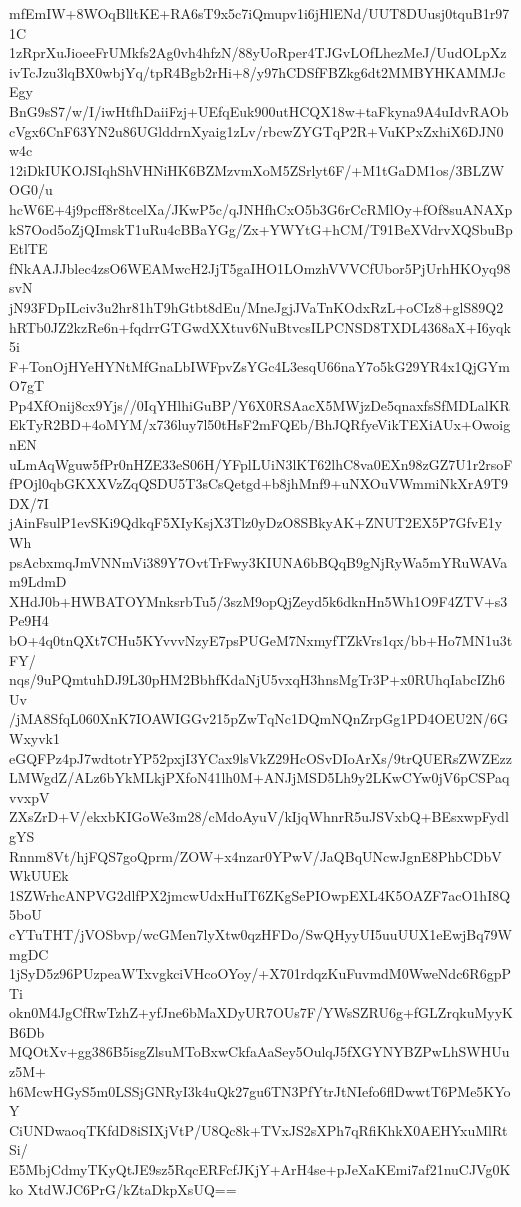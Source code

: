 mfEmIW+8WOqBlltKE+RA6sT9x5c7iQmupv1i6jHlENd/UUT8DUusj0tquB1r971C
1zRprXuJioeeFrUMkfs2Ag0vh4hfzN/88yUoRper4TJGvLOfLhezMeJ/UudOLpXz
ivTcJzu3lqBX0wbjYq/tpR4Bgb2rHi+8/y97hCDSfFBZkg6dt2MMBYHKAMMJcEgy
BnG9sS7/w/I/iwHtfhDaiiFzj+UEfqEuk900utHCQX18w+taFkyna9A4uIdvRAOb
cVgx6CnF63YN2u86UGlddrnXyaig1zLv/rbcwZYGTqP2R+VuKPxZxhiX6DJN0w4c
12iDkIUKOJSIqhShVHNiHK6BZMzvmXoM5ZSrlyt6F/+M1tGaDM1os/3BLZWOG0/u
hcW6E+4j9pcff8r8tcelXa/JKwP5c/qJNHfhCxO5b3G6rCcRMlOy+fOf8suANAXp
kS7Ood5oZjQImskT1uRu4cBBaYGg/Zx+YWYtG+hCM/T91BeXVdrvXQSbuBpEtlTE
fNkAAJJblec4zsO6WEAMwcH2JjT5gaIHO1LOmzhVVVCfUbor5PjUrhHKOyq98svN
jN93FDpILciv3u2hr81hT9hGtbt8dEu/MneJgjJVaTnKOdxRzL+oCIz8+glS89Q2
hRTb0JZ2kzRe6n+fqdrrGTGwdXXtuv6NuBtvcsILPCNSD8TXDL4368aX+I6yqk5i
F+TonOjHYeHYNtMfGnaLbIWFpvZsYGc4L3esqU66naY7o5kG29YR4x1QjGYmO7gT
Pp4XfOnij8cx9Yjs//0IqYHlhiGuBP/Y6X0RSAacX5MWjzDe5qnaxfsSfMDLalKR
EkTyR2BD+4oMYM/x736luy7l50tHsF2mFQEb/BhJQRfyeVikTEXiAUx+OwoignEN
uLmAqWguw5fPr0nHZE33eS06H/YFplLUiN3lKT62lhC8va0EXn98zGZ7U1r2rsoF
fPOjl0qbGKXXVzZqQSDU5T3sCsQetgd+b8jhMnf9+uNXOuVWmmiNkXrA9T9DX/7I
jAinFsulP1evSKi9QdkqF5XIyKsjX3Tlz0yDzO8SBkyAK+ZNUT2EX5P7GfvE1yWh
psAcbxmqJmVNNmVi389Y7OvtTrFwy3KIUNA6bBQqB9gNjRyWa5mYRuWAVam9LdmD
XHdJ0b+HWBATOYMnksrbTu5/3szM9opQjZeyd5k6dknHn5Wh1O9F4ZTV+s3Pe9H4
bO+4q0tnQXt7CHu5KYvvvNzyE7psPUGeM7NxmyfTZkVrs1qx/bb+Ho7MN1u3tFY/
nqs/9uPQmtuhDJ9L30pHM2BbhfKdaNjU5vxqH3hnsMgTr3P+x0RUhqIabcIZh6Uv
/jMA8SfqL060XnK7IOAWIGGv215pZwTqNc1DQmNQnZrpGg1PD4OEU2N/6GWxyvk1
eGQFPz4pJ7wdtotrYP52pxjI3YCax9lsVkZ29HcOSvDIoArXs/9trQUERsZWZEzz
LMWgdZ/ALz6bYkMLkjPXfoN41lh0M+ANJjMSD5Lh9y2LKwCYw0jV6pCSPaqvvxpV
ZXsZrD+V/ekxbKIGoWe3m28/cMdoAyuV/kIjqWhnrR5uJSVxbQ+BEsxwpFydlgYS
Rnnm8Vt/hjFQS7goQprm/ZOW+x4nzar0YPwV/JaQBqUNcwJgnE8PhbCDbVWkUUEk
1SZWrhcANPVG2dlfPX2jmcwUdxHuIT6ZKgSePIOwpEXL4K5OAZF7acO1hI8Q5boU
cYTuTHT/jVOSbvp/wcGMen7lyXtw0qzHFDo/SwQHyyUI5uuUUX1eEwjBq79WmgDC
1jSyD5z96PUzpeaWTxvgkciVHcoOYoy/+X701rdqzKuFuvmdM0WweNdc6R6gpPTi
okn0M4JgCfRwTzhZ+yfJne6bMaXDyUR7OUs7F/YWsSZRU6g+fGLZrqkuMyyKB6Db
MQOtXv+gg386B5isgZlsuMToBxwCkfaAaSey5OulqJ5fXGYNYBZPwLhSWHUuz5M+
h6McwHGyS5m0LSSjGNRyI3k4uQk27gu6TN3PfYtrJtNIefo6flDwwtT6PMe5KYoY
CiUNDwaoqTKfdD8iSIXjVtP/U8Qc8k+TVxJS2sXPh7qRfiKhkX0AEHYxuMlRtSi/
E5MbjCdmyTKyQtJE9sz5RqcERFcfJKjY+ArH4se+pJeXaKEmi7af21nuCJVg0Kko
XtdWJC6PrG/kZtaDkpXsUQ==
